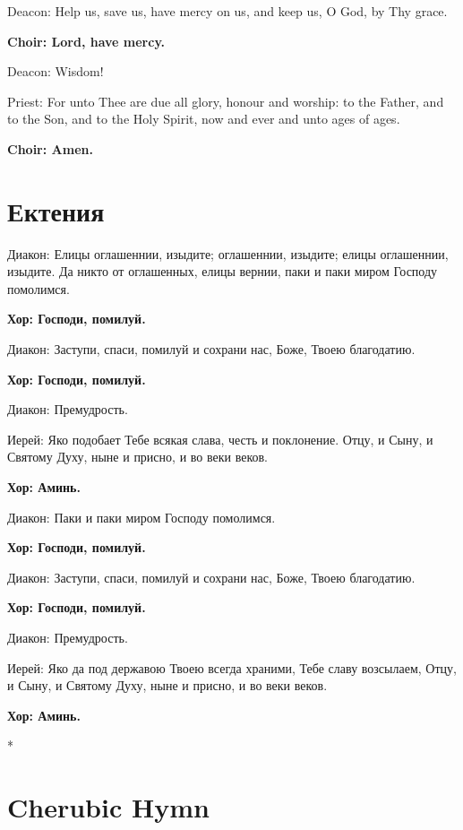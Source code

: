 \documentclass[12pt,a4paper,titlepage]{report}
\begin{document}
\begin{paracol}[1]{2}
  Deacon: Help us, save us, have mercy on us, and keep us, O God, by Thy grace.

  \textbf{Choir: Lord, have mercy.}

  Deacon: Wisdom!

  Priest: For unto Thee are due all glory, honour and worship: to the Father, and to the Son, and to the Holy Spirit, now and ever and unto ages of ages.

  \textbf{Choir: Amen.}

  \switchcolumn[1]

  \section*{Ектения}

  Диакон: Елицы оглашеннии, изыдите; оглашеннии, изыдите; елицы оглашеннии, изыдите. Да никто от оглашенных, елицы вернии, паки и паки миром Господу помолимся.

  \textbf{Хор: Господи, помилуй.}

  Диакон: Заступи, спаси, помилуй и сохрани нас, Боже, Твоею благодатию.

  \textbf{Хор: Господи, помилуй.}

  Диакон: Премудрость.

  Иерей: Яко подобает Тебе всякая слава, честь и поклонение. Отцу, и Сыну, и Святому Духу, ныне и присно, и во веки веков.

  \textbf{Хор: Аминь.}

  Диакон: Паки и паки миром Господу помолимся.

  \textbf{Хор: Господи, помилуй.}

  Диакон: Заступи, спаси, помилуй и сохрани нас, Боже, Твоею благодатию.

  \textbf{Хор: Господи, помилуй.}

  Диакон: Премудрость.

  Иерей: Яко да под державою Твоею всегда храними, Тебе славу возсылаем, Отцу, и Сыну, и Святому Духу, ныне и присно, и во веки веков.

  \textbf{Хор: Аминь.}

  \switchcolumn[0]*

  \section*{Cherubic Hymn}


\end{paracol}
\end{document}
